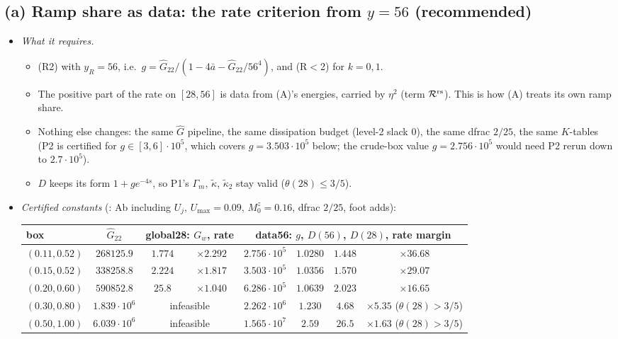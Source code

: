 \documentclass[11pt]{article}
\theoremstyle{remark}\newtheorem{remark}[theorem]{Remark}
\newcommand{\fn}[1]{\texttt{\detokenize{#1}}}
\begin{document}
\subsection*{(a) Ramp share as data: the rate criterion from $y=56$ (recommended)}
\begin{itemize}[leftmargin=*,itemsep=2pt]
\item \emph{What it requires.}
  \begin{itemize}[itemsep=0pt]
  \item (R2) with $y_R=56$, i.e.\ $g=\hat G_{22}/(1-4\bar a-\hat G_{22}/56^4)$, and (R$<$2) for $k=0,1$.
  \item The positive part of the rate on $[28,56]$ is data from (A)'s energies, carried by $\eta^2$ (term $\mathcal R^{\rm rs}$). This is how (A) treats its own ramp share.
  \item Nothing else changes: the same $\hat G$ pipeline, the same dissipation budget (level-2 slack $0$), the same dfrac $2/25$, the same $K$-tables (P2 is certified for $g\in[3,6]\cdot10^5$, which covers $g=3.503\cdot10^5$ below; the crude-box value $g=2.756\cdot10^5$ would need P2 rerun down to $2.7\cdot10^5$).
  \item $D$ keeps its form $1+ge^{-4s}$, so P1's $\Gamma_m$, $\tilde\kappa$, $\tilde\kappa_2$ stay valid ($\theta(28)\le3/5$).
  \end{itemize}
\item \emph{Certified constants} (\fn{ghat_design_arb.json}: Ab including $U_j$, $U_{\max}=0.09$, $M_0^z=0.16$, dfrac $2/25$, foot adds):
\begin{center}\small\begin{tabular}{@{}lccccccc@{}}\toprule
box & $\hat G_{22}$ & \multicolumn{2}{c}{global28: $G_w$, rate} & \multicolumn{4}{c}{data56: $g$, $D(56)$, $D(28)$, rate margin}\\\midrule
$(0.11,0.52)$ & $268125.9$ & $1.774$ & $\times2.292$ & $2.756\cdot10^5$ & $1.0280$ & $1.448$ & $\times36.68$\\
$(0.15,0.52)$ & $338258.8$ & $2.224$ & $\times1.817$ & $3.503\cdot10^5$ & $\mathbf{1.0356}$ & $1.570$ & $\mathbf{\times29.07}$\\
$(0.20,0.60)$ & $590852.8$ & $25.8$ & $\times1.040$ & $6.286\cdot10^5$ & $1.0639$ & $2.023$ & $\times16.65$\\
$(0.30,0.80)$ & $1.839\cdot10^6$ & \multicolumn{2}{c}{infeasible} & $2.262\cdot10^6$ & $1.230$ & $4.68$ & $\times5.35$ ($\theta(28)>3/5$)\\
$(0.50,1.00)$ & $6.039\cdot10^6$ & \multicolumn{2}{c}{infeasible} & $1.565\cdot10^7$ & $2.59$ & $26.5$ & $\times1.63$ ($\theta(28)>3/5$)\\\bottomrule

\end{tabular}
\end{center}
\end{itemize}
\end{document}
